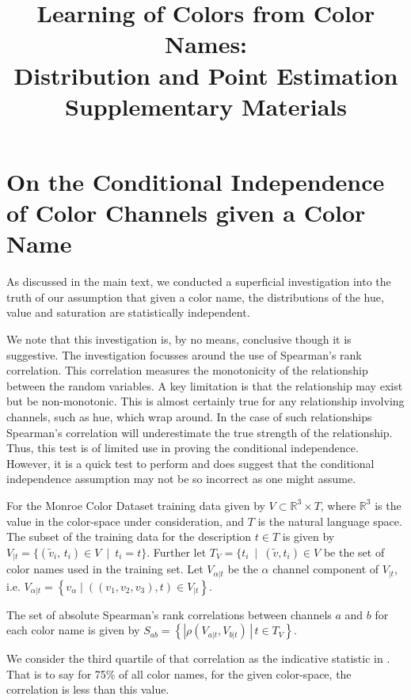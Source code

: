 \documentclass[11pt,a4paper]{article}
\title{Learning of Colors from Color Names: \\ Distribution and Point Estimation\\Supplementary Materials}
\author{}
\date{}
\begin{document}
\maketitle

\section{On the Conditional Independence of Color Channels given a Color Name}\label{sec:corrind}

As discussed in the main text, we conducted a superficial investigation into the truth of our assumption that given a color name, the distributions of the hue, value and saturation are statistically independent.

We note that this investigation is, by no means, conclusive though it is suggestive.
The investigation focusses around the use of Spearman's rank correlation.
This correlation measures the monotonicity of the relationship between the random variables.
A key limitation is that the relationship may exist but be non-monotonic.
This is almost certainly true for any relationship involving channels, such as hue, which wrap around.
In the case of such relationships Spearman's correlation will underestimate the true strength of the relationship.
Thus, this test is of limited use in proving the conditional independence.
However, it is a quick test to perform and does suggest that the conditional independence assumption may not be so incorrect as one might assume.


For the Monroe Color Dataset training data  given by $V \subset \mathbb{R}^{3}\times T$, where $\mathbb{R}^{3}$ is the value in the color-space under consideration, and $T$ is the natural language space.
The subset of the training data for the description $t \in T$ is given by
$V_{|t}=\{(\tilde{v}_i,\,t_i) \in V \: \mid \: t_{i}=t\}$.
Further let $T_V = \{t_i \: \mid \: (\tilde{v},t_i)\in V$ be the set of color names used in the training set.
Let $V_{\alpha|t}$ be the $\alpha$ channel component of $V_{|t}$, i.e. $V_{\alpha|t} = \left\lbrace v_\alpha \mid ((v_1,v_2,v_3), t) \in V_{|t} \right\rbrace$.

The set of absolute Spearman's rank correlations between channels $a$ and $b$ for each color name is given by
$S_{ab}=\left\lbrace \left|\rho(V_{a|t},V_{b|t})\,\right|\,t\in T_{V}\right\rbrace$.
\newpage

We consider the third quartile of that correlation as the indicative statistic in .
That is to say for 75\% of all color names, for the given color-space, the correlation is less than this value.
\end{document}

